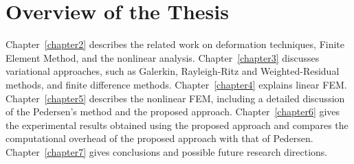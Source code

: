 \section{Overview of the Thesis}

Chapter~\ref{chapter2} describes the related work on deformation techniques, Finite Element Method, and the nonlinear analysis. Chapter~\ref{chapter3} discusses variational approaches, such as Galerkin, Rayleigh-Ritz and Weighted-Residual methods, and finite difference methods. Chapter~\ref{chapter4} explains linear FEM. Chapter~\ref{chapter5} describes the nonlinear FEM, including a detailed discussion of the Pedersen's method and the proposed approach. Chapter~\ref{chapter6} gives the experimental results obtained using the proposed approach and compares the computational overhead of the proposed approach with that of Pedersen. Chapter~\ref{chapter7} gives conclusions and possible future research directions.
